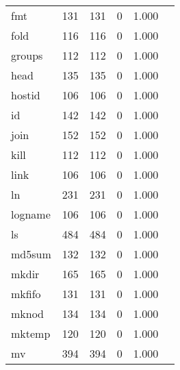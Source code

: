 \begin{longtable}{lp{2.20cm}p{2.20cm}p{2.20cm}p{2.20cm}p{2.20cm}}
fmt       &                     131 &              131 &                 0 &                        1.000 \\
fold      &                     116 &              116 &                 0 &                        1.000 \\
groups    &                     112 &              112 &                 0 &                        1.000 \\
head      &                     135 &              135 &                 0 &                        1.000 \\
hostid    &                     106 &              106 &                 0 &                        1.000 \\
id        &                     142 &              142 &                 0 &                        1.000 \\
join      &                     152 &              152 &                 0 &                        1.000 \\
kill      &                     112 &              112 &                 0 &                        1.000 \\
link      &                     106 &              106 &                 0 &                        1.000 \\
ln        &                     231 &              231 &                 0 &                        1.000 \\
logname   &                     106 &              106 &                 0 &                        1.000 \\
ls        &                     484 &              484 &                 0 &                        1.000 \\
md5sum    &                     132 &              132 &                 0 &                        1.000 \\
mkdir     &                     165 &              165 &                 0 &                        1.000 \\
mkfifo    &                     131 &              131 &                 0 &                        1.000 \\
mknod     &                     134 &              134 &                 0 &                        1.000 \\
mktemp    &                     120 &              120 &                 0 &                        1.000 \\
mv        &                     394 &              394 &                 0 &                        1.000 \\

\end{longtable}
